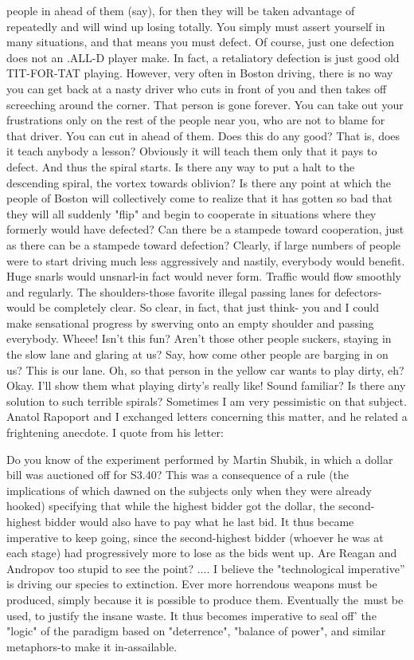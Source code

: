 people in ahead of them (say), for then they will be taken advantage of repeatedly and
will wind up losing totally. You simply must assert yourself in many situations, and that
means you must defect. Of course, just one defection does not an .ALL-D player make.
In fact, a retaliatory defection is just good old TIT-FOR-TAT playing. However, very
often in Boston driving, there is no way you can get back at a nasty driver who cuts in
front of you and then takes off screeching around the corner. That person is gone forever.
You can take out your frustrations only on the rest of the people near you, who are not to
blame for that driver. You can cut in ahead of them. Does this do any good? That is, does
it teach anybody a lesson? Obviously it will teach them only that it pays to defect. And
thus the spiral starts.
        Is there any way to put a halt to the descending spiral, the vortex towards
oblivion? Is there any point at which the people of Boston will collectively come to
realize that it has gotten so bad that they will all suddenly "flip" and begin to cooperate in
situations where they formerly would have defected? Can there be a stampede toward
cooperation, just as there can be a stampede toward defection?
        Clearly, if large numbers of people were to start driving much less aggressively
and nastily, everybody would benefit. Huge snarls would unsnarl-in fact would never
form. Traffic would flow smoothly and regularly. The shoulders-those favorite illegal
passing lanes for defectors-would be completely clear. So clear, in fact, that just think-
you and I could make sensational progress by swerving onto an empty shoulder and
passing everybody. Wheee! Isn't this fun? Aren't those other people suckers, staying in
the slow lane and glaring at us? Say, how come other people are barging in on us? This is
our lane. Oh, so that person in the yellow car wants to play dirty, eh? Okay. I'll show
them what playing dirty's really like!
        Sound familiar? Is there any solution to such terrible spirals? Sometimes I am
very pessimistic on that subject. Anatol Rapoport and I exchanged letters concerning this
matter, and he related a frightening anecdote. I quote from his letter:

           Do you know of the experiment performed by Martin Shubik, in which a
   dollar bill was auctioned off for S3.40? This was a consequence of a rule (the
   implications of which dawned on the subjects only when they were already
   hooked) specifying that while the highest bidder got the dollar, the second-highest
   bidder would also have to pay what he last bid. It thus became imperative to keep
   going, since the second-highest bidder (whoever he was at each stage) had
   progressively more to lose as the bids went up. Are Reagan and Andropov too
   stupid to see the point? ....
           I believe the "technological imperative'' is driving our species to
   extinction. Ever more horrendous weapons must be produced, simply because it is
   possible to produce them. Eventually the\, must be used, to justify the insane
   waste. It thus becomes imperative to seal off' the "logic" of the paradigm based on
   "deterrence", "balance of power", and similar metaphors-to make it in-assailable.




